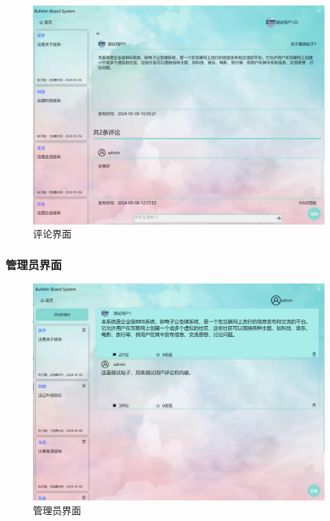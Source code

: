 \documentclass[UTF8]{ctexart}
\begin{document}
\begin{figure}[H]
  \centering
  \includegraphics[scale=0.3]{系统实现/帖子页面和评论.png}
  \caption{评论界面}
\end{figure}


\subsubsection{管理员界面}

\begin{figure}[H]
  \centering
  \includegraphics[scale=0.3]{系统实现/管理员界面.png}
  \caption{管理员界面}
\end{figure}
\end{document}

